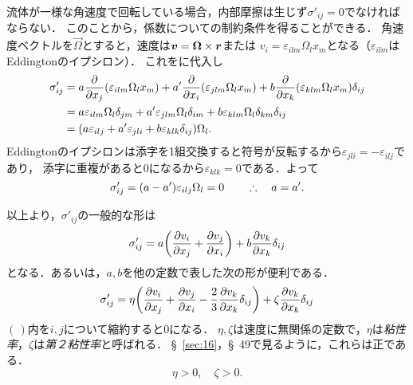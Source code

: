 流体が一様な角速度で回転している場合，内部摩擦は生じず$\sigma'_{ij}=0$でなければならない．
このことから，係数についての制約条件を得ることができる．
角速度ベクトルを$\vec{\Omega}$とすると，速度は$\vb*{v} = \vb*{\Omega}\times\vb*{r}$または
$v_i = \varepsilon_{ilm}\Omega_lx_m$となる（$\varepsilon_{ilm}$はEddingtonのイプシロン）．
これをに代入し
\begin{align*}
    \sigma'_{ij} &= a \pdv{x_j}(\varepsilon_{ilm}\Omega_lx_m) + a' \pdv{x_i}(\varepsilon_{jlm}\Omega_lx_m) + b \pdv{x_k}(\varepsilon_{klm}\Omega_lx_m) \delta_{ij} \\
    &= a \varepsilon_{ilm}\Omega_l\delta_{jm} + a' \varepsilon_{jlm}\Omega_l\delta_{im} + b \varepsilon_{klm}\Omega_l\delta_{km}\delta_{ij} \\
    &= \pqty{ a \varepsilon_{ilj} + a' \varepsilon_{jli} + b \varepsilon_{klk}\delta_{ij} } \Omega_l .
\end{align*}
Eddingtonのイプシロンは添字を1組交換すると符号が反転するから$\varepsilon_{jli} = -\varepsilon_{ilj}$であり，
添字に重複があると0になるから$\varepsilon_{klk}=0$である．よって
\[
    \sigma'_{ij} = (a-a') \varepsilon_{ilj} \Omega_l = 0
    \qquad\therefore\quad a = a' .
\]

以上より，$\sigma'_{ij}$の一般的な形は
\[
    \sigma'_{ij} = a \pqty{ \pdv{v_i}{x_j} + \pdv{v_j}{x_i} } + b \pdv{v_k}{x_k} \delta_{ij}
\]
となる．あるいは，$a,b$を他の定数で表した次の形が便利である．
\begin{equation}\label{eq15.3:粘性応力テンソルの具体形}
    \sigma'_{ij} = \eta \pqty{ \pdv{v_i}{x_j} + \pdv{v_j}{x_i} - \frac{2}{3}\pdv{v_k}{x_k} \delta_{ij} } + \zeta \pdv{v_k}{x_k} \delta_{ij}
\end{equation}
$(\,)$内を$i,j$について縮約すると0になる．
$\eta,\zeta$は速度に無関係の定数で，$\eta$は\emph{粘性率}，$\zeta$は\emph{第２粘性率}と呼ばれる．
\S~\ref{sec:16}，\S~49で見るように，これらは正である．
\begin{equation}
    \eta > 0, \quad \zeta > 0.
\end{equation}



